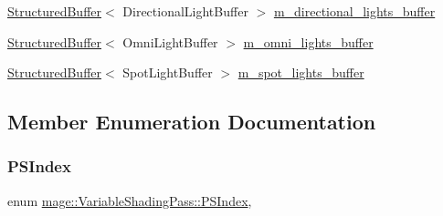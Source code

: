 \begin{DoxyCompactItemize}
\item 
\hyperlink{structmage_1_1_structured_buffer}{Structured\+Buffer}$<$ Directional\+Light\+Buffer $>$ \hyperlink{classmage_1_1_variable_shading_pass_ab69a4cb0b85f857a705887299efd17c7}{m\+\_\+directional\+\_\+lights\+\_\+buffer}
\item 
\hyperlink{structmage_1_1_structured_buffer}{Structured\+Buffer}$<$ Omni\+Light\+Buffer $>$ \hyperlink{classmage_1_1_variable_shading_pass_a143a6926802a7559db9feeb288ea7488}{m\+\_\+omni\+\_\+lights\+\_\+buffer}
\item 
\hyperlink{structmage_1_1_structured_buffer}{Structured\+Buffer}$<$ Spot\+Light\+Buffer $>$ \hyperlink{classmage_1_1_variable_shading_pass_a0ce22880761ceecd13a65450ca280d7c}{m\+\_\+spot\+\_\+lights\+\_\+buffer}
\end{DoxyCompactItemize}


\subsection{Member Enumeration Documentation}
\hypertarget{classmage_1_1_variable_shading_pass_a49519e421ac5be93136d9efdbf075d4a}{}\label{classmage_1_1_variable_shading_pass_a49519e421ac5be93136d9efdbf075d4a} 
\subsubsection{\texorpdfstring{P\+S\+Index}{PSIndex}}
{\footnotesize\ttfamily enum \hyperlink{classmage_1_1_variable_shading_pass_a49519e421ac5be93136d9efdbf075d4a}{mage\+::\+Variable\+Shading\+Pass\+::\+P\+S\+Index}\hspace{0.3cm}{\ttfamily [strong]}, {\ttfamily [private]}}

